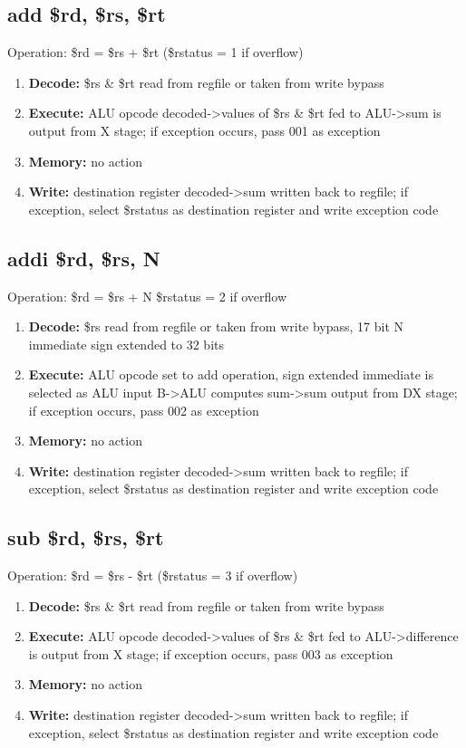 \documentclass[letterpaper]{article}
\begin{document}
\subsection{add \$rd, \$rs, \$rt}
Operation: \$rd = \$rs + \$rt (\$rstatus = 1 if overflow)
\begin{enumerate}
    \item \textbf{Decode:} \$rs \& \$rt read from regfile or taken from write bypass
    \item \textbf{Execute:} ALU opcode decoded->values of \$rs \& \$rt  fed to ALU->sum is output from X stage; if exception occurs, pass 001 as exception
    \item \textbf{Memory:} no action
    \item \textbf{Write:} destination register decoded->sum written back to regfile; if exception, select \$rstatus as destination register and write exception code
\end{enumerate}

\subsection{addi \$rd, \$rs, N}
Operation: \$rd = \$rs + N
\$rstatus = 2 if overflow
\begin{enumerate}
    \item \textbf{Decode:} \$rs read from regfile or taken from write bypass, 17 bit N immediate sign extended to 32 bits
    \item \textbf{Execute:} ALU opcode set to add operation, sign extended immediate is selected as ALU input B->ALU computes sum->sum output from DX stage; if exception occurs, pass 002 as exception
    \item \textbf{Memory:} no action
    \item \textbf{Write:} destination register decoded->sum written back to regfile; if exception, select \$rstatus as destination register and write exception code
\end{enumerate}

\subsection{sub \$rd, \$rs, \$rt}
Operation: \$rd = \$rs - \$rt (\$rstatus = 3 if overflow)
\begin{enumerate}
    \item \textbf{Decode:} \$rs \& \$rt read from regfile or taken from write bypass
    \item \textbf{Execute:} ALU opcode decoded->values of \$rs \& \$rt  fed to ALU->difference is output from X stage; if exception occurs, pass 003 as exception
    \item \textbf{Memory:} no action
    \item \textbf{Write:} destination register decoded->sum written back to regfile; if exception, select \$rstatus as destination register and write exception code
\end{enumerate}
\end{document}
